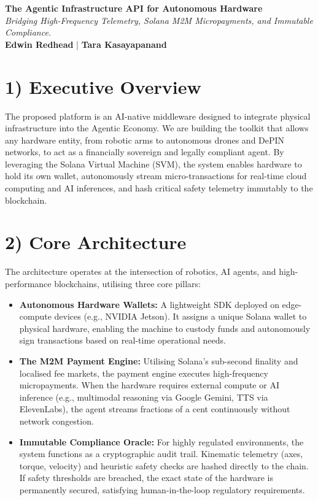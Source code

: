 \documentclass[10pt,a4paper]{article}
\begin{document}
\begin{center}
    {\LARGE \textbf{\color{solanapurple}The Agentic Infrastructure API for Autonomous Hardware}} \\[0.3cm]
    {\normalsize \textit{\color{darkgray}Bridging High-Frequency Telemetry, Solana M2M Micropayments, and Immutable Compliance.}} \\[0.4cm]
    {\small \textbf{Edwin Redhead} \quad | \quad \textbf{Tara Kasayapanand}}
\end{center}

\section*{1) Executive Overview}
The proposed platform is an AI-native middleware designed to integrate physical infrastructure into the Agentic Economy. We are building the toolkit that allows any hardware entity, from robotic arms to autonomous drones and DePIN networks, to act as a financially sovereign and legally compliant agent. By leveraging the Solana Virtual Machine (SVM), the system enables hardware to hold its own wallet, autonomously stream micro-transactions for real-time cloud computing and AI inferences, and hash critical safety telemetry immutably to the blockchain.


\section*{2) Core Architecture}
The architecture operates at the intersection of robotics, AI agents, and high-performance blockchains, utilising three core pillars:
\begin{itemize}
    \item \textbf{Autonomous Hardware Wallets:} A lightweight SDK deployed on edge-compute devices (e.g., NVIDIA Jetson). It assigns a unique Solana wallet to physical hardware, enabling the machine to custody funds and autonomously sign transactions based on real-time operational needs.
    \item \textbf{The M2M Payment Engine:} Utilising Solana's sub-second finality and localised fee markets, the payment engine executes high-frequency micropayments. When the hardware requires external compute or AI inference (e.g., multimodal reasoning via Google Gemini, TTS via ElevenLabs), the agent streams fractions of a cent continuously without network congestion.
    \item \textbf{Immutable Compliance Oracle:} For highly regulated environments, the system functions as a cryptographic audit trail. Kinematic telemetry (axes, torque, velocity) and heuristic safety checks are hashed directly to the chain. If safety thresholds are breached, the exact state of the hardware is permanently secured, satisfying human-in-the-loop regulatory requirements.
\end{itemize}
\end{document}
